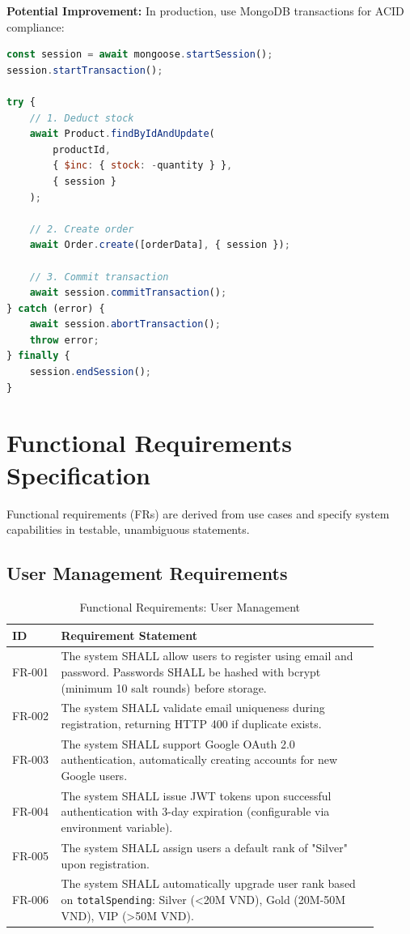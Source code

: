 \textbf{Potential Improvement:} In production, use MongoDB transactions for ACID compliance:

\begin{lstlisting}[language=JavaScript, caption=Transaction-based Order Placement (Future Enhancement)]
const session = await mongoose.startSession();
session.startTransaction();

try {
    // 1. Deduct stock
    await Product.findByIdAndUpdate(
        productId, 
        { $inc: { stock: -quantity } },
        { session }
    );
    
    // 2. Create order
    await Order.create([orderData], { session });
    
    // 3. Commit transaction
    await session.commitTransaction();
} catch (error) {
    await session.abortTransaction();
    throw error;
} finally {
    session.endSession();
}
\end{lstlisting}

\section{Functional Requirements Specification}

Functional requirements (FRs) are derived from use cases and specify system capabilities in testable, unambiguous statements.

\subsection{User Management Requirements}

\begin{table}[H]
\centering
\caption{Functional Requirements: User Management}
\label{tab:fr_user}
\small
\begin{tabular}{@{}p{0.12\linewidth}p{0.78\linewidth}@{}}
\toprule
\textbf{ID} & \textbf{Requirement Statement} \\
\midrule
FR-001 & The system SHALL allow users to register using email and password. Passwords SHALL be hashed with bcrypt (minimum 10 salt rounds) before storage. \\
FR-002 & The system SHALL validate email uniqueness during registration, returning HTTP 400 if duplicate exists. \\
FR-003 & The system SHALL support Google OAuth 2.0 authentication, automatically creating accounts for new Google users. \\
FR-004 & The system SHALL issue JWT tokens upon successful authentication with 3-day expiration (configurable via environment variable). \\
FR-005 & The system SHALL assign users a default rank of "Silver" upon registration. \\
FR-006 & The system SHALL automatically upgrade user rank based on \texttt{totalSpending}: Silver (\textless 20M VND), Gold (20M-50M VND), VIP (\textgreater 50M VND). \\
\bottomrule
\end{tabular}
\end{table}

